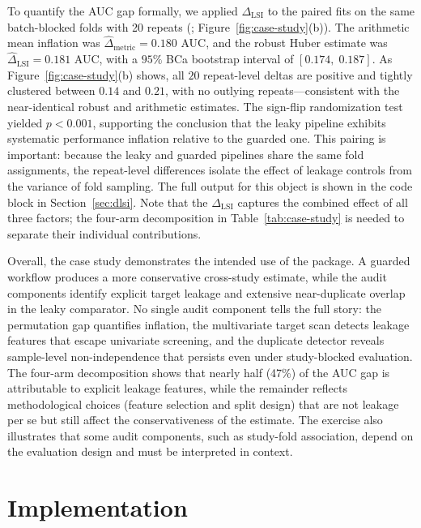 \documentclass[article,shortnames]{jss}
\begin{document}
To quantify the AUC gap formally, we applied $\Delta_{\mathrm{LSI}}$ to the
paired fits on the same batch-blocked folds with 20 repeats
(; Figure~\ref{fig:case-study}(b)).
The arithmetic mean inflation was $\widehat{\Delta}_{\mathrm{metric}}
= 0.180$ AUC, and the robust Huber estimate was
$\widehat{\Delta}_{\mathrm{LSI}} = 0.181$ AUC, with a $95\%$ BCa
bootstrap interval of $[0.174,\; 0.187]$. As
Figure~\ref{fig:case-study}(b) shows, all $20$ repeat-level deltas are
positive and tightly clustered between $0.14$ and $0.21$, with no outlying
repeats---consistent with the near-identical robust and arithmetic estimates.
The sign-flip randomization test yielded $p < 0.001$, supporting the
conclusion that the leaky pipeline exhibits systematic performance inflation
relative to the guarded one. This pairing is
important: because the leaky and guarded pipelines share the same fold
assignments, the repeat-level differences isolate the effect of leakage
controls from the variance of fold sampling. The full 
output for this  object is shown in the code block in
Section~\ref{sec:dlsi}. Note that the $\Delta_\mathrm{LSI}$ captures
the combined effect of all three factors; the four-arm decomposition in
Table~\ref{tab:case-study} is needed to separate their individual
contributions.

Overall, the case study demonstrates the intended use of the package. A guarded
workflow produces a more conservative cross-study estimate, while the audit
components identify explicit target leakage and extensive near-duplicate overlap
in the leaky comparator. No single audit component tells the full story:
the permutation gap quantifies inflation, the multivariate target scan detects
leakage features that escape univariate screening, and the duplicate detector
reveals sample-level non-independence that persists even under study-blocked
evaluation. The four-arm decomposition shows that nearly half (47\%) of the
AUC gap is attributable to explicit leakage features, while the remainder
reflects methodological choices (feature selection and split design) that are
not leakage per se but still affect the conservativeness of the estimate.
The exercise also illustrates that some audit components, such as study-fold
association, depend on the evaluation design and must be interpreted in context.

\section{Implementation}\label{sec:implementation}
\end{document}
